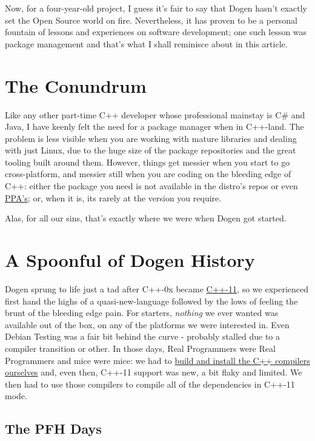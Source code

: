 \documentclass{book}
\begin{document}
Now, for a four-year-old project, I guess it's fair to say that Dogen
hasn't exactly set the Open Source world on fire. Nevertheless, it has
proven to be a personal fountain of lessons and experiences on
software development; one such lesson was package management and
that's what I shall reminisce about in this article.

\section*{The Conundrum}
\label{sec-1}

Like any other part-time C++ developer whose professional mainstay is
C\# and Java, I have keenly felt the need for a package manager when in
C++-land. The problem is less visible when you are working with mature
libraries and dealing with just Linux, due to the huge size of the
package repositories and the great tooling built around them. However,
things get messier when you start to go cross-platform, and messier
still when you are coding on the bleeding edge of C++: either the
package you need is not available in the distro's repos or even \href{https://launchpad.net/ubuntu/\%2Bppas}{PPA's};
or, when it is, its rarely at the version you require.

Alas, for all our sins, that's exactly where we were when Dogen got
started.

\section*{A Spoonful of Dogen History}
\label{sec-2}

Dogen sprung to life just a tad after C++-0x became \href{https://en.wikipedia.org/wiki/C\%252B\%252B11}{C++-11}, so we
experienced first hand the highs of a quasi-new-language followed by
the lows of feeling the brunt of the bleeding edge pain. For starters,
\emph{nothing} we ever wanted was available out of the box, on any of the
platforms we were interested in. Even Debian Testing was a fair bit
behind the curve - probably stalled due to a compiler transition or
other. In those days, Real Programmers were Real Programmers and mice
were mice: we had to \href{http://mcraveiro.blogspot.co.uk/2012/06/nerd-food-c-11-with-gcc.html}{build and install the C++ compilers ourselves}
and, even then, C++-11 support was new, a bit flaky and limited. We
then had to use those compilers to compile all of the dependencies in
C++-11 mode.

\subsection*{The PFH Days}
\label{sec-2-1}
\end{document}
